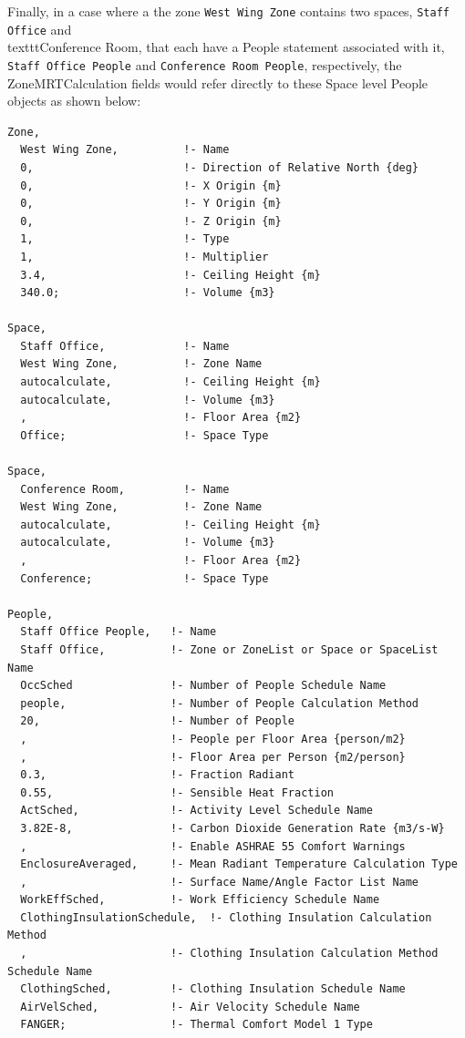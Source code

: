 Finally, in a case where a the zone \texttt{West Wing Zone} contains two spaces, \texttt{Staff Office} and \\texttt{Conference Room}, that each have a People statement associated with it, \texttt{Staff Office People} and \texttt{Conference Room People}, respectively, the ZoneMRTCalculation fields would refer directly to these Space level People objects as shown below:

\begin{lstlisting}
Zone,
  West Wing Zone,          !- Name
  0,                       !- Direction of Relative North {deg}
  0,                       !- X Origin {m}
  0,                       !- Y Origin {m}
  0,                       !- Z Origin {m}
  1,                       !- Type
  1,                       !- Multiplier
  3.4,                     !- Ceiling Height {m}
  340.0;                   !- Volume {m3}
  
Space,
  Staff Office,            !- Name
  West Wing Zone,          !- Zone Name
  autocalculate,           !- Ceiling Height {m}
  autocalculate,           !- Volume {m3}
  ,                        !- Floor Area {m2}
  Office;                  !- Space Type

Space,
  Conference Room,         !- Name
  West Wing Zone,          !- Zone Name
  autocalculate,           !- Ceiling Height {m}
  autocalculate,           !- Volume {m3}
  ,                        !- Floor Area {m2}
  Conference;              !- Space Type
  
People,
  Staff Office People,   !- Name
  Staff Office,          !- Zone or ZoneList or Space or SpaceList Name
  OccSched               !- Number of People Schedule Name
  people,                !- Number of People Calculation Method
  20,                    !- Number of People
  ,                      !- People per Floor Area {person/m2}
  ,                      !- Floor Area per Person {m2/person}
  0.3,                   !- Fraction Radiant
  0.55,                  !- Sensible Heat Fraction
  ActSched,              !- Activity Level Schedule Name
  3.82E-8,               !- Carbon Dioxide Generation Rate {m3/s-W}
  ,                      !- Enable ASHRAE 55 Comfort Warnings
  EnclosureAveraged,     !- Mean Radiant Temperature Calculation Type
  ,                      !- Surface Name/Angle Factor List Name
  WorkEffSched,          !- Work Efficiency Schedule Name
  ClothingInsulationSchedule,  !- Clothing Insulation Calculation Method
  ,                      !- Clothing Insulation Calculation Method Schedule Name
  ClothingSched,         !- Clothing Insulation Schedule Name
  AirVelSched,           !- Air Velocity Schedule Name
  FANGER;                !- Thermal Comfort Model 1 Type


\end{lstlisting}
